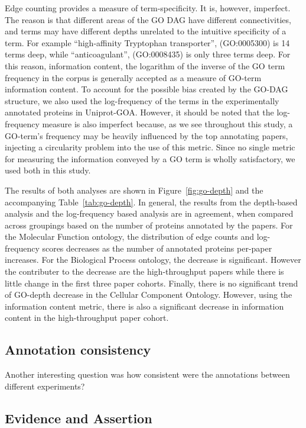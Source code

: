 \documentclass[12pt]{article}
\begin{document}
Edge counting provides a measure of term-specificity. It is, however, imperfect. The reason is
that different areas of the GO DAG have different connectivities, and terms may have different
depths unrelated to the intuitive specificity of a term. For example ``high-affinity Tryptophan
transporter'', (GO:0005300) is 14 terms deep, while ``anticoagulant'', (GO:0008435) is only three
terms deep.  For this reason, information content, the logarithm of the inverse of the GO term
frequency in the corpus is generally accepted as a measure of GO-term information
content\cite{lord-semsim}. To account for the possible bias created by the GO-DAG structure, we
also used the log-frequency of the terms in the experimentally annotated proteins in Uniprot-GOA.
However, it should be noted that the log-frequency measure is also imperfect because, as we see
throughout this study, a GO-term's frequency may be heavily influenced  by the top annotating
papers, injecting a circularity problem into the use of this metric. Since no
single metric for measuring the information conveyed by a GO term is wholly satisfactory, we used
both in this study.

The results of both analyses are shown in Figure~\ref{fig:go-depth} and the accompanying
Table~\ref{tab:go-depth}. In general, the results from the depth-based analysis and the
log-frequency based analysis are in agreement, when compared across groupings based on the
number of proteins annotated by the papers. For the Molecular Function ontology, the
distribution of edge counts and log-frequency scores decreases as the number of annotated
proteins per-paper increases.  For the Biological Process ontology, the decrease is
significant. However the contributer to the decrease are the high-throughput papers
while there is little change in the first three paper cohorts.
Finally, there is no significant trend of GO-depth decrease in the Cellular Component
Ontology. However, using the information content metric, there is also a significant decrease
in information content in the high-throughput paper cohort.

\subsection*{Annotation consistency}
Another interesting question was how consistent were the annotations between different experiments?


\subsection*{Evidence and Assertion}
\end{document}
